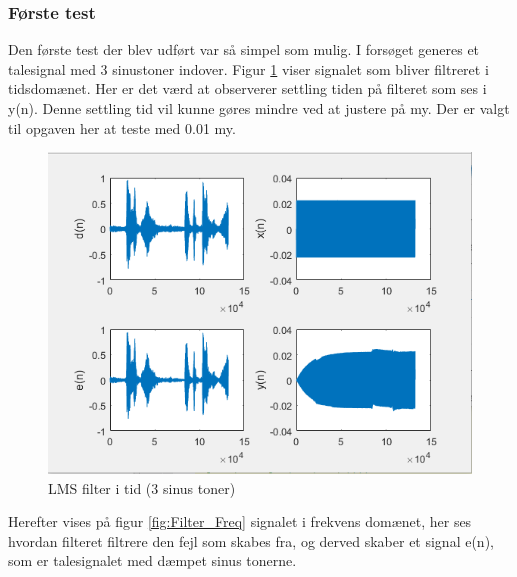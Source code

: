 \subsubsection{Første test}
Den første test der blev udført var så simpel som mulig. I forsøget generes et talesignal med 3 sinustoner indover. 
Figur \ref{fig:Filter_time} viser signalet som bliver filtreret i tidsdomænet. Her er det værd at observerer settling tiden på filteret som ses i y(n). Denne settling tid vil kunne gøres mindre ved at justere på my. Der er valgt til opgaven her at teste med 0.01 my. 
\begin{figure}[H]
	\centering
	\includegraphics[width = 400pt]{Img/Filter_time}
	\caption{LMS filter i tid (3 sinus toner)}
	\label{fig:Filter_time}
\end{figure}
\newpage
Herefter vises på figur \ref{fig:Filter_Freq} signalet i frekvens domænet, her ses hvordan filteret filtrere den fejl som skabes fra, og derved skaber et signal e(n), som er talesignalet med dæmpet sinus tonerne. 

